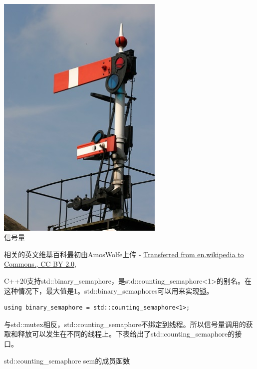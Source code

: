 \begin{center}
\includegraphics[width=0.6\textwidth]{content/3/chapter6/images/16.png}\\
信号量
\end{center}

相关的英文维基百科最初由AmosWolfe上传 - \href{https://commons.wikimedia.org/w/index.php?curid=1972304}{Transferred from en.wikipedia to Commons., CC BY 2.0,}

C++20支持std::binary\_semaphore，是std::counting\_semaphore<1>的别名。在这种情况下，最大值是1。std::binary\_semaphores可以用来实现\href{https://en.cppreference.com/w/cpp/named_req/BasicLockable}{锁}。

\begin{lstlisting}[style=styleCXX]
using binary_semaphore = std::counting_semaphore<1>;
\end{lstlisting}

与std::mutex相反，std::counting\_semaphore不绑定到线程。所以信号量调用的获取和释放可以发生在不同的线程上。下表给出了std::counting\_semaphore的接口。

\begin{center}
std::counting\_semaphore sem的成员函数
\end{center}

